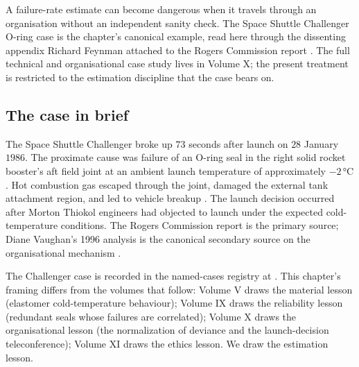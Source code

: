 A failure-rate estimate can become dangerous when it travels through
an organisation without an independent sanity check. The Space
Shuttle Challenger O-ring case is the chapter's canonical example,
read here through the dissenting appendix Richard Feynman attached to
the Rogers Commission report \cite{acc:nasa-challenger,paper:ch09-feynman-appendix-f}.
The full technical and organisational case study lives in Volume X;
the present treatment is restricted to the estimation discipline
that the case bears on.

\subsection{The case in brief}

The Space Shuttle Challenger broke up $73$ seconds after launch on
$28$ January $1986$. The proximate cause was failure of an O-ring
seal in the right solid rocket booster's aft field joint at an
ambient launch temperature of approximately $-2 \,\si{\degreeCelsius}$.
Hot combustion gas escaped through the joint, damaged the external
tank attachment region, and led to vehicle breakup
\cite{acc:nasa-challenger}. The launch decision occurred after
Morton Thiokol engineers had objected to launch under the expected
cold-temperature conditions. The Rogers Commission report is the
primary source; Diane Vaughan's 1996 analysis is the canonical
secondary source on the organisational mechanism
\cite{hist:vaughan1996}.

The Challenger case is recorded in the named-cases registry at
. This chapter's
framing differs from the volumes that follow: Volume V draws the
material lesson (elastomer cold-temperature behaviour); Volume IX
draws the reliability lesson (redundant seals whose failures are
correlated); Volume X draws the organisational lesson (the
normalization of deviance and the launch-decision teleconference);
Volume XI draws the ethics lesson. We draw the estimation lesson.

